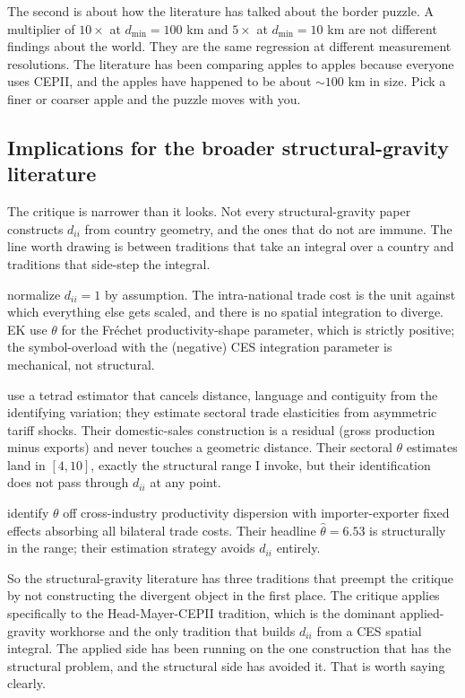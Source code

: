 \documentclass[11pt, letterpaper]{article}
\theoremstyle{definition}
\newcommand{\dii}{d_{ii}}
\begin{document}
The second is about how the literature has talked about the border
puzzle. A multiplier of $10\times$ at $d_{\min} = 100$ km and
$5\times$ at $d_{\min} = 10$ km are not different findings about
the world. They are the same regression at different measurement
resolutions. The literature has been comparing apples to apples
because everyone uses CEPII, and the apples have happened to be
about $\sim 100$ km in size. Pick a finer or coarser apple and the
puzzle moves with you.

\subsection{Implications for the broader structural-gravity literature}
\label{sec:structural-implications}

The critique is narrower than it looks. Not every structural-gravity
paper constructs $\dii$ from country geometry, and the ones that do
not are immune. The line worth drawing is between traditions that
take an integral over a country and traditions that side-step the
integral.

\citet{eaton_kortum_2002} normalize $\dii = 1$ by assumption. The
intra-national trade cost is the unit against which everything else
gets scaled, and there is no spatial integration to diverge. EK use
$\theta$ for the Fréchet productivity-shape parameter, which is
strictly positive; the symbol-overload with the (negative) CES
integration parameter is mechanical, not structural.

\citet{caliendo_parro_2015} use a tetrad estimator that cancels
distance, language and contiguity from the identifying variation;
they estimate sectoral trade elasticities from asymmetric tariff
shocks. Their domestic-sales construction is a residual (gross
production minus exports) and never touches a geometric distance.
Their sectoral $\theta$ estimates land in $[4, 10]$, exactly the
structural range I invoke, but their identification does not pass
through $\dii$ at any point.

\citet{costinot_donaldson_komunjer_2012} identify $\theta$ off
cross-industry productivity dispersion with importer-exporter fixed
effects absorbing all bilateral trade costs. Their headline
$\hat\theta = 6.53$ is structurally in the range; their estimation
strategy avoids $\dii$ entirely.

So the structural-gravity literature has three traditions that
preempt the critique by not constructing the divergent object in
the first place. The critique applies specifically to the
Head-Mayer-CEPII tradition, which is the dominant applied-gravity
workhorse and the only tradition that builds $\dii$ from a CES
spatial integral. The applied side has been running on the one
construction that has the structural problem, and the structural
side has avoided it. That is worth saying clearly.
\end{document}

